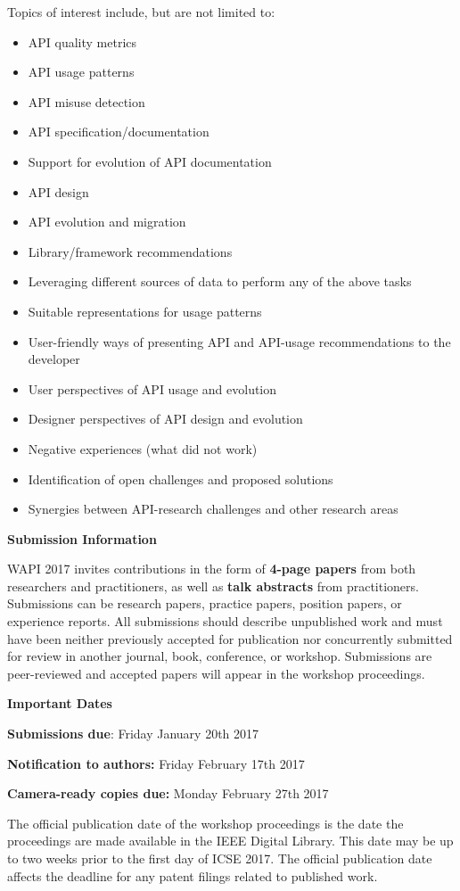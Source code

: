 \documentclass[10pt, conference]{IEEEtran}
\newcommand{\shortname}{WAPI}
\begin{document}
Topics of interest include, but are not limited to:
\begin{itemize}
\setlength\itemsep{5pt}

\item API quality metrics
\item API usage patterns
\item API misuse detection
\item API specification/documentation
\item Support for evolution of API documentation
\item API design
\item API evolution and migration
\item Library/framework recommendations
\item Leveraging different sources of data to perform any of the above tasks
\item Suitable representations for usage patterns
\item User-friendly ways of presenting API and API-usage recommendations to the developer
\item User perspectives of API usage and evolution
\item Designer perspectives of API design and evolution
\item Negative experiences (what did not work)
\item Identification of open challenges and proposed solutions
\item Synergies between API-research challenges and other research areas  
\end{itemize}


\vspace{0.2cm}
\noindent
\textbf{\large Submission Information}
\vspace{0.2cm}

\shortname{} 2017 invites contributions in the form of \textbf{4-page papers} from both researchers and practitioners, as well as \textbf{talk abstracts} from practitioners. Submissions can be research papers, practice papers, position papers, or experience reports. All submissions should describe unpublished work and must have been neither previously accepted for publication nor concurrently submitted for review in another journal, book, conference, or workshop. Submissions are peer-reviewed and accepted papers will appear in the workshop proceedings.

\vspace{0.2cm}
\noindent
\textbf{\large Important Dates}
\vspace{0.2cm}

\textbf{Submissions due}: Friday January 20th 2017

\textbf{Notification to authors:} Friday February 17th 2017

\textbf{Camera-ready copies due:} Monday February 27th 2017

\vspace{0.2cm}

The official publication date of the workshop proceedings is the date the proceedings are made available in the IEEE Digital Library. This date may be up to two weeks prior to the first day of ICSE 2017. The official publication date affects the deadline for any patent filings related to published work.
\end{document}

